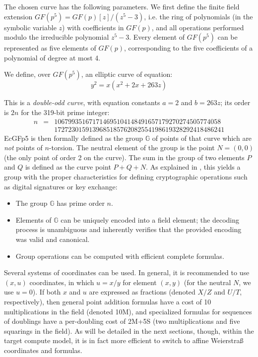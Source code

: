 \documentclass{llncs}
\newcommand{\GF}{GF}
\newcommand{\bG}{\mathbb{G}}
\begin{document}
The chosen curve has the following parameters. We first define the
finite field extension $\GF(p^5) = \GF(p)[z]/(z^5-3)$, i.e. the ring of
polynomials (in the symbolic variable $z$) with coefficients in
$\GF(p)$, and all operations performed modulo the irreducible polynomial
$z^5-3$. Every element of $\GF(p^5)$ can be represented as five elements
of $\GF(p)$, corresponding to the five coefficients of a polynomial of
degree at most 4.

We define, over $\GF(p^5)$, an elliptic curve of equation:
\begin{equation*}
    y^2 = x(x^2 + 2x + 263z)
\end{equation*}

This is a \emph{double-odd curve}\cite{Por2020-4}, with equation
constants $a = 2$ and $b = 263z$; its order is $2n$ for the 319-bit
prime integer:
\begin{eqnarray*}
    n &=& 106799351671714695104148491657179270274505774058 \\
      & & 1727230159139685185762082554198619328292418486241
\end{eqnarray*}
EcGFp5 is then formally defined as the group $\bG$ of points of that
curve which are \emph{not} points of $n$-torsion. The neutral element
of the group is the point $N = (0, 0)$ (the only point of order 2 on
the curve). The sum in the group of two elements $P$ and $Q$ is defined
as the curve point $P+Q+N$. As explained in \cite{Por2020-4}, this
yields a group with the proper characteristics for defining cryptographic
operations such as digital signatures or key exchange:
\begin{itemize}

    \item The group $\bG$ has prime order $n$.

    \item Elements of $\bG$ can be uniquely encoded into a field
    element; the decoding process is unambiguous and inherently
    verifies that the provided encoding was valid and canonical.

    \item Group operations can be computed with efficient complete
    formulas.

\end{itemize}

Several systems of coordinates can be used. In general, it is
recommended to use $(x, u)$ coordinates, in which $u = x/y$ for element
$(x, y)$ (for the neutral $N$, we use $u = 0$). If both $x$ and $u$ are
expressed as fractions (denoted $X/Z$ and $U/T$, respectively), then
general point addition formulas have a cost of 10 multiplications in the
field (denoted 10M), and specialized formulas for sequences of doublings
have a per-doubling cost of 2M+5S (two multiplications and five
squarings in the field). As will be detailed in the next sections,
though, within the target compute model, it is in fact more efficient to
switch to affine Weierstraß coordinates and formulas.
\end{document}
